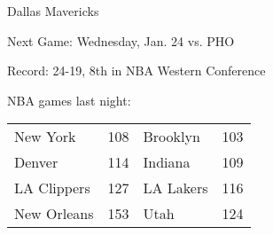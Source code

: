 Dallas Mavericks

Next Game: Wednesday, Jan. 24 vs. PHO

Record: 24-19, 8th in NBA Western Conference

NBA games last night:
\begin{tabular}{llll}
\toprule
   New York & 108 &  Brooklyn & 103 \\
     Denver & 114 &   Indiana & 109 \\
LA Clippers & 127 & LA Lakers & 116 \\
New Orleans & 153 &      Utah & 124 \\
\bottomrule
\end{tabular}
